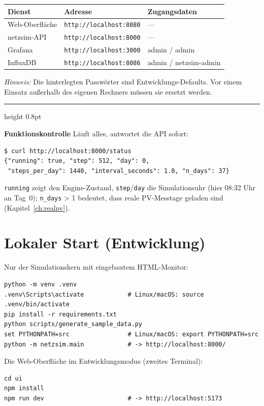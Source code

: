 \documentclass[11pt,a4paper,parskip=half]{scrreprt}
\newenvironment{beispiel}[1][Beispiel]
  {\par\medskip
   {\color{bsp}\hrule height 0.8pt}\nopagebreak\smallskip
   \noindent\textbf{\textsf{\textcolor{bsp}{#1}}}\quad\ignorespaces}
  {\par\nopagebreak\smallskip{\color{bsp}\hrule height 0.8pt}\par\medskip}
\begin{document}
\begin{center}
\begin{tabular}{@{}lll@{}}
\toprule
Dienst & Adresse & Zugangsdaten \\
\midrule
Web-Oberfläche & \texttt{http://localhost:8080} & --- \\
netzsim-API & \texttt{http://localhost:8000} & --- \\
Grafana & \texttt{http://localhost:3000} & admin / admin \\
InfluxDB & \texttt{http://localhost:8086} & admin / netzsim-admin \\
\bottomrule
\end{tabular}
\end{center}

\emph{Hinweis:} Die hinterlegten Passwörter sind Entwicklungs-Defaults.
Vor einem Einsatz außerhalb des eigenen Rechners müssen sie ersetzt
werden.

\begin{beispiel}[Funktionskontrolle]
Läuft alles, antwortet die API sofort:
\begin{lstlisting}
$ curl http://localhost:8000/status
{"running": true, "step": 512, "day": 0,
 "steps_per_day": 1440, "interval_seconds": 1.0, "n_days": 37}
\end{lstlisting}
\texttt{running} zeigt den Engine-Zustand, \texttt{step}/\texttt{day}
die Simulationsuhr (hier 08:32 Uhr an Tag~0); \texttt{n\_days} > 1
bedeutet, dass reale PV-Messtage geladen sind
(Kapitel~\ref{ch:realpv}).
\end{beispiel}

\section{Lokaler Start (Entwicklung)}

Nur der Simulationskern mit eingebautem HTML-Monitor:

\begin{lstlisting}
python -m venv .venv
.venv\Scripts\activate            # Linux/macOS: source .venv/bin/activate
pip install -r requirements.txt
python scripts/generate_sample_data.py
set PYTHONPATH=src                # Linux/macOS: export PYTHONPATH=src
python -m netzsim.main            # -> http://localhost:8000/
\end{lstlisting}

Die Web-Oberfläche im Entwicklungsmodus (zweites Terminal):

\begin{lstlisting}
cd ui
npm install
npm run dev                       # -> http://localhost:5173
\end{lstlisting}
\end{document}
